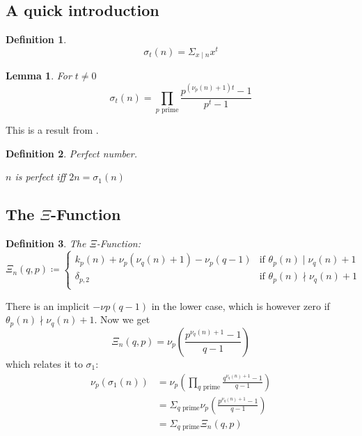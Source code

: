\documentclass{article}
\newenvironment{pg}{

}{

\medskip

}
\newtheorem{definition}{Definition}
\newtheorem{lemma}{Lemma}[section]
\begin{document}
	\subsection{A quick introduction}
	
	\begin{pg}
		\begin{definition}
			\begin{equation*}
				σ_t(n) = Σ_{x \mid n} x^t
			\end{equation*}
		\end{definition}
		
		\begin{lemma} For $t≠0$
			\begin{equation*}
				σ_t(n) = \prod_{p \text{ prime}} \frac{p^{(ν_p(n) + 1)t} - 1}{p^t - 1}
			\end{equation*}
		\end{lemma}
		This is a result from \cite{hardy2008}.
	\end{pg}
	
	\begin{pg}
		\begin{definition} Perfect number.
			\begin{center}
				$n$ is perfect iff $2n = σ_1(n)$
			\end{center}
		\end{definition}
	\end{pg}
	
	\subsection{The \texorpdfstring{$Ξ$}{Ξ}-Function}
	
	\begin{definition} The $Ξ$-Function:
		\begin{equation*}
			Ξ_n(q,p) \coloneq 
			\begin{cases}
				k_p(n) + ν_p(ν_q(n) + 1) - ν_p(q-1) & \text{if } θ_p(n) \mid ν_q(n) + 1 \\
				δ_{p,2} & \text{if } θ_p(n) \nmid ν_q(n) + 1 \\
			\end{cases}
		\end{equation*}
	\end{definition}
	There is an implicit $-νp(q-1)$ in the lower case, which is however zero if $θ_p(n) \nmid ν_q(n) + 1$.
	Now we get
	\begin{equation*}
		Ξ_n(q,p) = ν_p\left( \frac{p^{ν_q(n)+1}-1}{q-1} \right)
	\end{equation*}
	which relates it to $σ_1$:
	\begin{equation*}
		\begin{split}
			ν_p(σ_1(n)) &= ν_p\left(  \prod_{q \text{ prime}} \frac{q^{ν_q(n)+1}-1}{q-1} \right) \\
			&= Σ_{q \text{ prime}} ν_p\left( \frac{p^{ν_q(n)+1}-1}{q-1} \right) \\
			&= Σ_{q \text{ prime}} Ξ_n(q,p)
		\end{split}
	\end{equation*}
	
\end{document}
